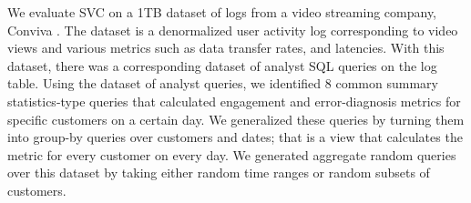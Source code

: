 We evaluate SVC on a 1TB dataset of logs from a video streaming company, Conviva \cite{conviva}.
The dataset is a denormalized user activity log corresponding to video views and various metrics such as data transfer rates, and latencies.
With this dataset, there was a corresponding dataset of analyst SQL queries on the log table.
Using the dataset of analyst queries, we identified 8 common summary statistics-type queries that calculated engagement and error-diagnosis metrics for specific customers on a certain day.
We generalized these queries by turning them into group-by queries over customers and dates; that is a view that calculates the metric for every customer on every day.
We generated aggregate random queries over this dataset by taking either random time ranges or random subsets of customers.

